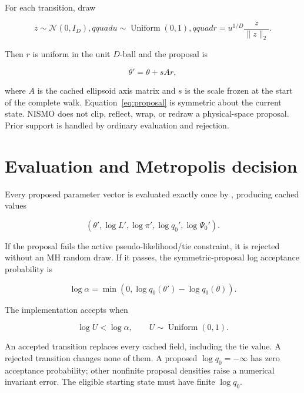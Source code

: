 \documentclass[11pt,a4paper]{article}
\newcommand{\NISMO}{\textsc{NISMO}}
\newcommand{\code}[1]{\texttt{\detokenize{#1}}}
\begin{document}
For each transition, draw

\begin{equation}
  z\sim\mathcal{N}(0,I_D),qquad
  u\sim\operatorname{Uniform}(0,1),qquad
  r=u^{1/D}\frac{z}{\lVert z\rVert_2}.
\end{equation}

Then \(r\) is uniform in the unit \(D\)-ball and the proposal is

\begin{equation}
  \theta'=\theta+sAr,
  \label{eq:proposal}
\end{equation}

where \(A\) is the cached ellipsoid axis matrix and \(s\) is the scale frozen
at the start of the complete walk.  Equation~\eqref{eq:proposal} is symmetric
about the current state.  \NISMO{} does not clip, reflect, wrap, or redraw a
physical-space proposal.  Prior support is handled by ordinary evaluation and
rejection.

\section{Evaluation and Metropolis decision}

Every proposed parameter vector is evaluated exactly once by
\code{BatchEvaluator}, producing cached values

\begin{equation}
  \left(\theta',\log L',\log\pi',\log q_0',\log\Psi_0'\right).
\end{equation}

If the proposal fails the active pseudo-likelihood/tie constraint, it is
rejected without an MH random draw.  If it passes, the symmetric-proposal log
acceptance probability is

\begin{equation}
  \log\alpha
  =\min\left(0,\log q_0(\theta')-\log q_0(\theta)\right).
  \label{eq:mh}
\end{equation}

The implementation accepts when

\begin{equation}
  \log U < \log\alpha,
  \qquad U\sim\operatorname{Uniform}(0,1).
\end{equation}

An accepted transition replaces every cached field, including the tie value.
A rejected transition changes none of them.  A proposed \(\log q_0=-\infty\)
has zero acceptance probability; other nonfinite proposal densities raise a
numerical invariant error.  The eligible starting state must have finite
\(\log q_0\).
\end{document}

